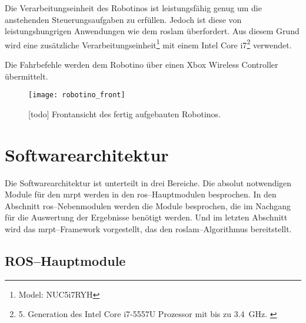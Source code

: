 Die Verarbeitungseinheit des Robotinos ist leistungsfähig genug um die anstehenden Steuerungsaufgaben zu erfüllen. Jedoch ist diese von leistungshungrigen Anwendungen wie dem \Gls{roslam} überfordert. Aus diesem Grund wird eine zusätzliche Verarbeitungseinheit\footnote{Model: NUC5i7RYH} mit einem Intel Core i7\footnote{5. Generation des Intel Core i7-5557U Prozessor mit bis zu \SI{3.4}{\GHz}. \cite{intel2015nucproductbrief}} verwendet.

Die Fahrbefehle werden dem Robotino über einen Xbox Wireless Controller übermittelt.

\begin{figure}[h]
	\centering
	\texttt{[image: robotino\_front]}
	\caption{[todo] Frontansicht des fertig aufgebauten Robotinos.}
	\label{fig:robotino_front}
\end{figure}


\begin{comment}
--------------------------------------------------------------------------------
- Kurzbeschreibung der Modulfunktion
- Welche Funktion erfüllt dieses Modul
- Welche ROS-Messages/-Topics/-Services bietet dieses Modul
\end{comment}
\section{Softwarearchitektur}

Die Softwarearchitektur ist unterteilt in drei Bereiche. Die absolut notwendigen Module für den \Gls{mrpt} werden in den \Gls{ros}--Hauptmodulen besprochen. In den Abschnitt \Gls{ros}--Nebenmodulen werden die Module besprochen, die im Nachgang für die Auswertung der Ergebnisse benötigt werden. Und im letzten Abschnitt wird das \Gls{mrpt}--Framework vorgestellt, das den \Gls{roslam}--Algorithmus bereitstellt.


\begin{comment}
--------------------------------------------------------------------------------
- Begrifflichkeiten wie Topic, Sessage, Service usw. wurden bereits im Grundlagenkapitel geklärt.
- todo: Grundlagen ROS: URDF--Files, Lauch--Files, TF--Tree (odom, base_link, map?), Wofür braucht man Koordinatensystemtransformationen?
- todo: Übersicht über alle Module und deren Verbindung zu einander?
\end{comment}
\subsection{ROS--Hauptmodule}


